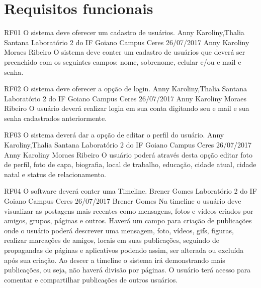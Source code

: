  \section{Requisitos funcionais}
 	
 \requisitoFuncional
 {RF01}
 {O sistema deve oferecer um cadastro de usuários.}
 {Anny Karoliny,Thalia Santana}
 {Laboratório 2 do IF Goiano Campus Ceres}
 {26/07/2017}
 {Anny Karoliny Moraes Ribeiro}
 {O sistema deve conter um cadastro de usuários que deverá ser preenchido com os seguintes campos: nome, sobrenome, celular e/ou e mail e senha.
 }
 
 \requisitoFuncional
 {RF02}
 {O sistema deve oferecer a opção de login.}
 {Anny Karoliny,Thalia Santana}
 {Laboratório 2 do IF Goiano Campus Ceres}
 {26/07/2017}
 {Anny Karoliny Moraes Ribeiro}
 {O usuário deverá realizar login em sua conta digitando seu e mail e sua senha cadastrados anteriormente.
 }
 
 \requisitoFuncional
 {RF03}
 {O sistema deverá dar a opção de editar o perfil do usuário.}
 {Anny Karoliny,Thalia Santana}
 {Laboratório 2 do IF Goiano Campus Ceres}
 {26/07/2017}
 {Anny Karoliny Moraes Ribeiro}
 {O usuário poderá através desta opção editar foto de perfil, foto de capa, biografia, local de trabalho, educação, cidade atual, cidade natal e status de relacionamento.
 }
 
 \requisitoFuncional
 {RF04}
 {O software deverá conter uma Timeline.}
 {Brener Gomes}
 {Laboratório 2 do IF Goiano Campus Ceres}
 {26/07/2017}
 {Brener Gomes}
 {Na timeline o usuário deve visualizar as postagens mais recentes como mensagens, fotos e vídeos criados por amigos, grupos, páginas e outros. Haverá um campo para criação de publicações onde o usuário poderá descrever uma mensagem, foto, vídeos, gifs, figuras, realizar marcações de amigos, locais em suas publicações, seguindo de propagandas de páginas e aplicativos podendo assim, ser alterada ou excluída após sua criação. Ao descer a timeline o sistema irá demonstrando mais publicações, ou seja, não haverá divisão por páginas. O usuário terá acesso para comentar e compartilhar publicações de outros usuários.
 }
 
